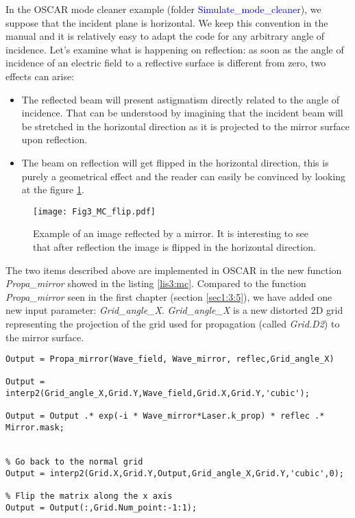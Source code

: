 In the OSCAR mode cleaner example (folder \textcolor{blue}{Simulate\_mode\_cleaner}), we suppose that the incident plane is horizontal. We keep this convention in the manual and it is relatively easy to adapt the code for any arbitrary angle of incidence. Let's examine what is happening on reflection: as soon as the angle of incidence of an electric field to a reflective surface is different from zero, two effects can arise:
\begin{itemize}
  \item The reflected beam will present astigmatism directly related to the angle of incidence.
  That can be understood by imagining that the incident beam will be stretched in the horizontal direction as it is projected to the mirror surface upon reflection.
  \item The beam on reflection will get flipped in the horizontal direction, this is purely a geometrical effect and the reader can easily be convinced by looking at the figure \ref{fig3:MC_flip}.
\end{itemize}

\begin{figure}
\begin{center}
\texttt{[image: Fig3\_MC\_flip.pdf]}
\end{center}
\caption{Example of an image reflected by a mirror. It is interesting to see that after reflection the image is flipped in the horizontal direction. \label{fig3:MC_flip}}
\end{figure}

The two items described above are implemented in OSCAR in the new function \emph{Propa\_mirror} showed in the listing \ref{lis3:mc}. Compared to the function \emph{Propa\_mirror} seen in the first chapter (section \ref{sec1:3:5}), we have added one new input parameter: \textsl{Grid\_angle\_X}. \textsl{Grid\_angle\_X} is a new distorted 2D grid representing the projection of the grid used for propagation (called \textsl{Grid.D2}) to the mirror surface.

\begin{lstlisting}[float=btp,caption=Reflection on a mirror for arbitrary angle of incidence\label{lis3:mc},frame=lines]
% Stretch the laser beam as seen by the mirror
Output = Propa_mirror(Wave_field, Wave_mirror, reflec,Grid_angle_X)

Output = interp2(Grid_angle_X,Grid.Y,Wave_field,Grid.X,Grid.Y,'cubic');

Output = Output .* exp(-i * Wave_mirror*Laser.k_prop) * reflec .* Mirror.mask;


% Go back to the normal grid
Output = interp2(Grid.X,Grid.Y,Output,Grid_angle_X,Grid.Y,'cubic',0);

% Flip the matrix along the x axis
Output = Output(:,Grid.Num_point:-1:1);
\end{lstlisting}

